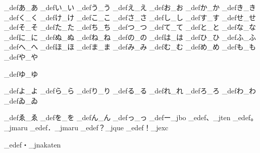 \brl@char_def{あ}{\brl@char@alias_あ}
\brl@char_def{い}{\brl@char@alias_い}
\brl@char_def{う}{\brl@char@alias_う}
\brl@char_def{え}{\brl@char@alias_え}
\brl@char_def{お}{\brl@char@alias_お}
\brl@char_def{か}{\brl@char@alias_か}
\brl@char_def{き}{\brl@char@alias_き}
\brl@char_def{く}{\brl@char@alias_く}
\brl@char_def{け}{\brl@char@alias_け}
\brl@char_def{こ}{\brl@char@alias_こ}
\brl@char_def{さ}{\brl@char@alias_さ}
\brl@char_def{し}{\brl@char@alias_し}
\brl@char_def{す}{\brl@char@alias_す}
\brl@char_def{せ}{\brl@char@alias_せ}
\brl@char_def{そ}{\brl@char@alias_そ}
\brl@char_def{た}{\brl@char@alias_た}
\brl@char_def{ち}{\brl@char@alias_ち}
\brl@char_def{つ}{\brl@char@alias_つ}
\brl@char_def{て}{\brl@char@alias_て}
\brl@char_def{と}{\brl@char@alias_と}
\brl@char_def{な}{\brl@char@alias_な}
\brl@char_def{に}{\brl@char@alias_に}
\brl@char_def{ぬ}{\brl@char@alias_ぬ}
\brl@char_def{ね}{\brl@char@alias_ね}
\brl@char_def{の}{\brl@char@alias_の}
\brl@char_def{は}{\brl@char@alias_は}
\brl@char_def{ひ}{\brl@char@alias_ひ}
\brl@char_def{ふ}{\brl@char@alias_ふ}
\brl@char_def{へ}{\brl@char@alias_へ}
\brl@char_def{ほ}{\brl@char@alias_ほ}
\brl@char_def{ま}{\brl@char@alias_ま}
\brl@char_def{み}{\brl@char@alias_み}
\brl@char_def{む}{\brl@char@alias_む}
\brl@char_def{め}{\brl@char@alias_め}
\brl@char_def{も}{\brl@char@alias_も}
\brl@char_def{や}{\brl@char@alias_や}

\brl@char_def{ゆ}{\brl@char@alias_ゆ}

\brl@char_def{よ}{\brl@char@alias_よ}
\brl@char_def{ら}{\brl@char@alias_ら}
\brl@char_def{り}{\brl@char@alias_り}
\brl@char_def{る}{\brl@char@alias_る}
\brl@char_def{れ}{\brl@char@alias_れ}
\brl@char_def{ろ}{\brl@char@alias_ろ}
\brl@char_def{わ}{\brl@char@alias_わ}
\brl@char_def{ゐ}{\brl@char@alias_ゐ}

\brl@char_def{ゑ}{\brl@char@alias_ゑ}
\brl@char_def{を}{\brl@char@alias_を}
\brl@char_def{ん}{\brl@char@alias_ん}
\brl@char_def{っ}{\brl@char@alias_っ}
\brl@char_def{ー}{\brl@char@alias_jbo}
\brl@char_edef{、}{\brl@char@alias_jten}
\brl@char_edef{。}{\brl@char@alias_jmaru}
%
\brl@char_edef{．}{\brl@char@alias_jmaru}
\brl@char_edef{？}{\brl@char@alias_jque}
\brl@char_edef{！}{\brl@char@alias_jexc}

\brl@char_edef{・}{\brl@char@alias_jnakaten}

